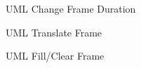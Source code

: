 \documentclass[11pt]{article} %
\begin{document}
{\begin{figure}[H]
	\centering
	\caption{UML Change Frame Duration}
	\label{fig:UML2 }
\end{figure}

\begin{figure}[H]
	\centering
	\caption{UML Translate Frame}
	\label{fig:UML2 }
\end{figure}

\begin{figure}[H]
	\centering
	\caption{UML Fill/Clear Frame}
	\label{fig:UML2 }
\end{figure}

}
\end{document}
